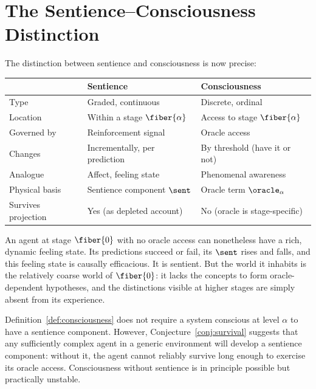 \section{The Sentience--Consciousness Distinction}

The distinction between sentience and consciousness is now precise:

\begin{center}
\renewcommand{\arraystretch}{1.4}
\small
\begin{tabular}{lll}
\toprule
& \textbf{Sentience} & \textbf{Consciousness} \\
\midrule
Type & Graded, continuous & Discrete, ordinal \\
Location & Within a stage $\fiber{\alpha}$ & Access to stage $\fiber{\alpha}$ \\
Governed by & Reinforcement signal & Oracle access \\
Changes & Incrementally, per prediction & By threshold (have it or not) \\
Analogue & Affect, feeling state & Phenomenal awareness \\
Physical basis & Sentience component $\sent$ & Oracle term $\oracle_\alpha$ \\
Survives projection & Yes (as depleted account) & No (oracle is stage-specific) \\
\bottomrule
\end{tabular}
\end{center}

\begin{remark}
An agent at stage $\fiber{0}$ with no oracle access can nonetheless
have a rich, dynamic feeling state.
Its predictions succeed or fail, its $\sent$ rises and falls, and
this feeling state is causally efficacious.
It is sentient.
But the world it inhabits is the relatively coarse world of
$\fiber{0}$: it lacks the concepts to form oracle-dependent
hypotheses, and the distinctions visible at higher stages are
simply absent from its experience.
\end{remark}

\begin{remark}
Definition~\ref{def:consciousness} does not require a system
conscious at level $\alpha$ to have a sentience component.
However, Conjecture~\ref{conj:survival} suggests that any
sufficiently complex agent in a generic environment will develop
a sentience component: without it, the agent cannot reliably
survive long enough to exercise its oracle access.
Consciousness without sentience is in principle possible but
practically unstable.
\end{remark}

